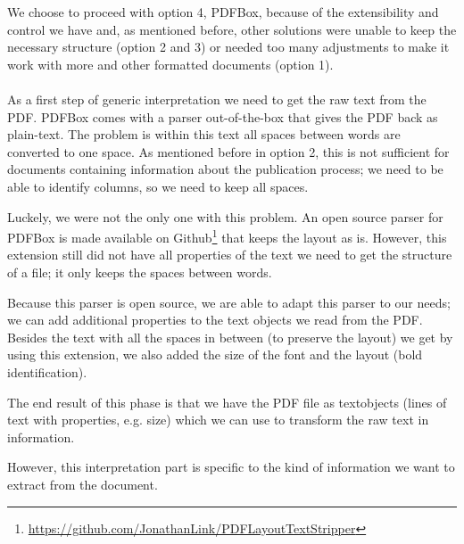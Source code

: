 \documentclass{ou-report}
\begin{document}
We choose to proceed with option 4, PDFBox, because of the extensibility and
control we have
and, as mentioned before, other solutions were unable to keep the necessary
structure (option 2 and 3) or needed too many adjustments to make it work with
more and other formatted documents (option 1).

\paragraph{}
As a first step of generic interpretation we need to get the raw text from 
the PDF. PDFBox comes with a 
parser out-of-the-box that gives the PDF back as plain-text. The problem is 
within this text all spaces between words are converted to one space. As 
mentioned before in option 2, this is not sufficient for documents containing 
information 
about the publication process; we need to be able to 
identify columns, so we need to keep all spaces.

Luckely, we were not the only one with this problem. 
An open source parser for PDFBox is made available on
Github\footnote{\url{https://github.com/JonathanLink/PDFLayoutTextStripper}} 
that keeps the layout as is. However, this extension still 
did not have all
properties of the text we need to get the structure of a file; it only keeps the
spaces between words. 

Because this parser is open source, we are able to adapt this parser to our 
needs; we can add additional properties to the text objects we read from the 
PDF. Besides the text with all the spaces in between (to preserve the layout) we
get by using this extension, we also added the size of the font and the layout
(bold identification).

The end result of this phase is that we have the PDF file as textobjects (lines 
of text with properties, e.g. size) which we can use to transform the raw text 
in information.

However, this interpretation part is specific to the kind of information we 
want to extract from the document.
\end{document}
